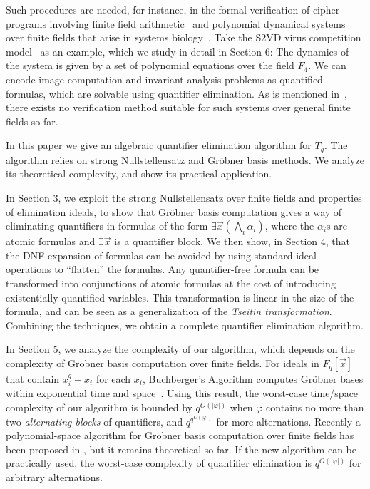 \documentclass[envcountsect]{llncs}
\begin{document}
Such procedures are needed, for instance, in the formal verification of cipher programs involving finite field arithmetic~\cite{SmithD08,using} and polynomial dynamical systems over finite fields that arise in systems biology~\cite{virus,bio2,poly}. Take the S2VD virus competition model~\cite{virus} as an example, which we study in detail in Section 6: The dynamics of the system is given by a set of polynomial equations over the field $F_4$. We can encode image computation and invariant analysis problems as quantified formulas, which are solvable using quantifier elimination. As is mentioned in~\cite{virus}, there exists no verification method suitable for such systems over general finite fields so far.

In this paper we give an algebraic quantifier elimination algorithm for $T_q$. The algorithm relies on strong Nullstellensatz and Gr\"obner basis methods. We analyze its theoretical complexity, and show its practical application. 

In Section 3, we exploit the strong Nullstellensatz over finite fields and properties of elimination ideals, to show that Gr\"obner basis computation gives a way of eliminating quantifiers in formulas of the form $\exists \vec x (\bigwedge_i \alpha_i)$, where the $\alpha_i$s are atomic formulas and $\exists \vec x$ is a quantifier block. We then show, in Section 4, that the DNF-expansion of formulas can be avoided by using standard ideal operations to ``flatten'' the formulas. Any quantifier-free formula can be transformed into conjunctions of atomic formulas at the cost of introducing existentially quantified variables. This transformation is linear in the size of the formula, and can be seen as a generalization of the {\em Tseitin transformation}. Combining the techniques, we obtain a complete quantifier elimination algorithm. 

In Section 5, we analyze the complexity of our algorithm, which depends on the complexity of Gr\"obner basis computation over finite fields. For ideals in $F_q[\vec x]$ that contain $x_i^q-x_i$ for each $x_i$, Buchberger's Algorithm computes Gr\"obner bases within exponential time and space~\cite{Lakshman}. Using this result, the worst-case time/space complexity of our algorithm is bounded by $q^{O(|\varphi|)}$ when $\varphi$ contains no more than two {\em alternating blocks} of quantifiers, and $q^{q^{O(|\varphi|)}}$ for more alternations. Recently a polynomial-space algorithm for Gr\"obner basis computation over finite fields has been proposed in \cite{pspaceGB}, but it remains theoretical so far. If the new algorithm can be practically used, the worst-case complexity of quantifier elimination is $q^{O(|\varphi|)}$ for arbitrary alternations. 
\end{document}
